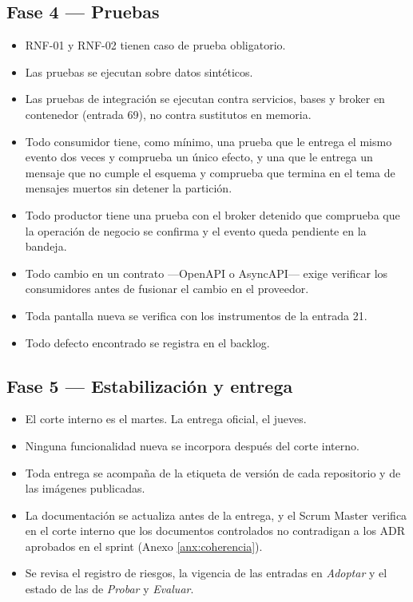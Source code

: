 \documentclass[11pt,a4paper]{article}
\begin{document}
\subsection{Fase 4 — Pruebas}

\begin{itemize}
\item RNF-01 y RNF-02 tienen caso de prueba obligatorio.
\item Las pruebas se ejecutan sobre datos sintéticos.
\item Las pruebas de integración se ejecutan contra servicios, bases y broker en contenedor (entrada 69), no contra sustitutos en memoria.
\item Todo consumidor tiene, como mínimo, una prueba que le entrega el mismo evento dos veces y comprueba un único efecto, y una que le entrega un mensaje que no cumple el esquema y comprueba que termina en el tema de mensajes muertos sin detener la partición.
\item Todo productor tiene una prueba con el broker detenido que comprueba que la operación de negocio se confirma y el evento queda pendiente en la bandeja.
\item Todo cambio en un contrato ---OpenAPI o AsyncAPI--- exige verificar los consumidores antes de fusionar el cambio en el proveedor.
\item Toda pantalla nueva se verifica con los instrumentos de la entrada 21.
\item Todo defecto encontrado se registra en el backlog.
\end{itemize}

\subsection{Fase 5 — Estabilización y entrega}

\begin{itemize}
\item El corte interno es el martes. La entrega oficial, el jueves.
\item Ninguna funcionalidad nueva se incorpora después del corte interno.
\item Toda entrega se acompaña de la etiqueta de versión de cada repositorio y de las imágenes publicadas.
\item La documentación se actualiza antes de la entrega, y el Scrum Master verifica en el corte interno que los documentos controlados no contradigan a los ADR aprobados en el sprint (Anexo \ref{anx:coherencia}).
\item Se revisa el registro de riesgos, la vigencia de las entradas en \emph{Adoptar} y el estado de las de \emph{Probar} y \emph{Evaluar}.
\end{itemize}
\end{document}
